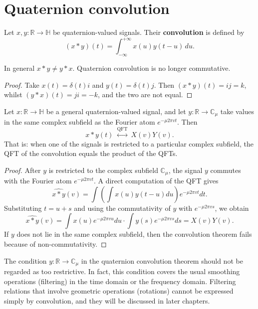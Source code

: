 \section{Quaternion convolution}

\begin{definition}\label{def:q_convolution}
Let $x,y:\mathbb{R}\to\mathbb{H}$ be quaternion-valued signals. Their \textbf{convolution} is defined by
\[
(x*y)(t)=\int_{-\infty}^{+\infty}x(u)y(t-u)\,du.
\]
\end{definition}

\begin{theorem}\label{thm:q_convolution_noncommutative}
In general $x*y\neq y*x$. Quaternion convolution is no longer commutative.
\end{theorem}

\begin{proof}
Take $x(t)=\delta(t)i$ and $y(t)=\delta(t)j$. Then $(x*y)(t)=ij=k$, whilst $(y*x)(t)=ji=-k$, and the two are not equal.
\end{proof}

\begin{theorem}\label{thm:q_convolution_theorem}
Let $x:\mathbb{R}\to\mathbb{H}$ be a general quaternion-valued signal, and let $y:\mathbb{R}\to\mathbb{C}_\mu$ take values in the same complex subfield as the Fourier atom $e^{-\mu 2\pi vt}$. Then
\[
x*y(t)\ \overset{\text{QFT}}{\longleftrightarrow}\ X(v)Y(v).
\]
That is: when one of the signals is restricted to a particular complex subfield, the QFT of the convolution equals the product of the QFTs.
\end{theorem}

\begin{proof}
After $y$ is restricted to the complex subfield $\mathbb{C}_\mu$, the signal $y$ commutes with the Fourier atom $e^{-\mu 2\pi vt}$. A direct computation of the QFT gives
\[
\widehat{x*y}(v)=\int\left(\int x(u)y(t-u)du\right)e^{-\mu 2\pi vt}dt.
\]
Substituting $t=u+s$ and using the commutativity of $y$ with $e^{-\mu 2\pi vs}$, we obtain
\[
\widehat{x*y}(v)=\int x(u)e^{-\mu 2\pi vu}du\cdot\int y(s)e^{-\mu 2\pi vs}ds=X(v)Y(v).
\]
If $y$ does not lie in the same complex subfield, then the convolution theorem fails because of non-commutativity.
\end{proof}

\begin{remark}\label{rem:q_convolution_restriction}
The condition $y:\mathbb{R}\to\mathbb{C}_\mu$ in the quaternion convolution theorem should not be regarded as too restrictive. In fact, this condition covers the usual smoothing operations (filtering) in the time domain or the frequency domain. Filtering relations that involve geometric operations (rotations) cannot be expressed simply by convolution, and they will be discussed in later chapters.
\end{remark}

